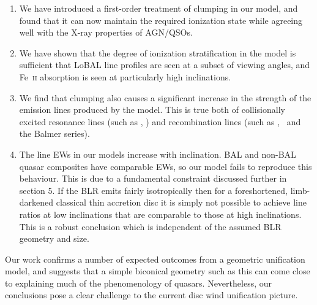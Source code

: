 \documentclass[useAMS,usenatbib]{mn2e_x}
\begin{document}
\begin{enumerate}
\item We have introduced a first-order treatment 
of clumping in our model, and found that it can now maintain
the required ionization state while agreeing well with the X-ray
properties of AGN/QSOs.
\smallskip
\item We have shown that the degree of ionization stratification
in the model is sufficient that LoBAL line profiles
are seen at a subset of viewing angles, and Fe~\textsc{ii}
absorption is seen at particularly high inclinations.
\smallskip
\item We find that clumping also causes a significant 
increase in the strength of the  emission
lines produced by the model. This is true both
of collisionally excited resonance lines (such as \civ, \nv)
and recombination lines (such as \la, \ha\ and the Balmer series).
\smallskip
\item The line EWs in our models increase with inclination.
BAL and non-BAL quasar composites have comparable EWs, so our model
fails to reproduce this behaviour.
This is due to a fundamental constraint discussed further in section 5. If the BLR
emits fairly isotropically then for a foreshortened, limb-darkened classical thin accretion disc
it is simply not possible to achieve line ratios at low inclinations that are comparable to
those at high inclinations. This is a robust conclusion which 
is independent of the assumed BLR geometry and size.
\end{enumerate}
Our work confirms a number of expected outcomes from a geometric unification 
model, and suggests that a simple biconical geometry such as this can come close to 
explaining much of the  phenomenology of quasars. Nevertheless, our conclusions pose 
a clear challenge to the current disc wind unification picture.
\end{document}
